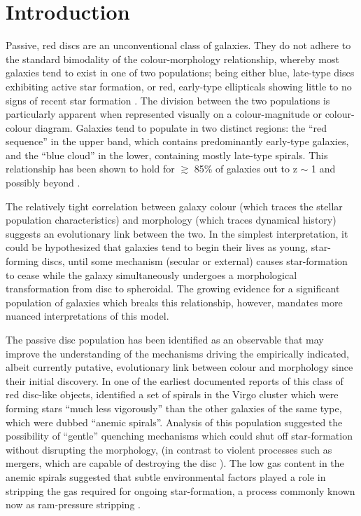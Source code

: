 \documentclass[useAMS,usenatbib]{mn2e}
\begin{document}
\section{Introduction}
\label{sec:Intro}

Passive, red discs are an unconventional class of galaxies. They do not adhere to the standard bimodality of the colour-morphology relationship, whereby most galaxies tend to exist in one of two populations; being either blue, late-type discs exhibiting active star formation, or red, early-type ellipticals showing little to no signs of recent star formation \citep{Strateva2001, Baldry2004, Correa2017}. The division between the two populations is particularly apparent when represented visually on a colour-magnitude or colour-colour diagram. Galaxies tend to populate in two distinct regions: the ``red sequence'' in the upper band, which contains predominantly early-type galaxies, and the ``blue cloud'' in the lower, containing mostly late-type spirals. This relationship has been shown to hold for $\gtrsim$ 85\% of galaxies out to z $\sim$ 1 \citep{Bell2004,Cirasuolo2007,Mignoli2009} and possibly beyond \citep{Giallongo2005, vanDokkum2006, Franzetti2007, Cassata2008}. 

The relatively tight correlation between galaxy colour (which traces the stellar population characteristics) and morphology (which traces dynamical history) suggests an evolutionary link between the two. In the simplest interpretation, it could be hypothesized that galaxies tend to begin their lives as young, star-forming discs, until some mechanism (secular or external) causes star-formation to cease while the galaxy simultaneously undergoes a morphological transformation from disc to spheroidal. The growing evidence for a significant population of galaxies which breaks this relationship, however, mandates more nuanced interpretations of this model. 

The passive disc population has been identified as an observable that may improve the understanding of the mechanisms driving the empirically indicated, albeit currently putative, evolutionary link between colour and morphology since their initial discovery.  In one of the earliest documented reports of this class of red disc-like objects, \citet{VandenBergh1976} identified a set of spirals in the Virgo cluster which were forming stars ``much less vigorously'' than the other galaxies of the same type, which were dubbed ``anemic spirals''. Analysis of this population suggested the possibility of ``gentle'' quenching mechanisms which could shut off star-formation without disrupting the morphology, (in contrast to violent processes such as mergers, which are capable of destroying the disc \citep{Bell2004,Negroponte1983,DeLucia2006,Springel2005}). The low gas content in the anemic spirals suggested that subtle environmental factors played a role in stripping the gas required for ongoing star-formation, a process commonly known now as ram-pressure stripping \citep{Gunn1972,Steinhauser2016}. 
\end{document}
